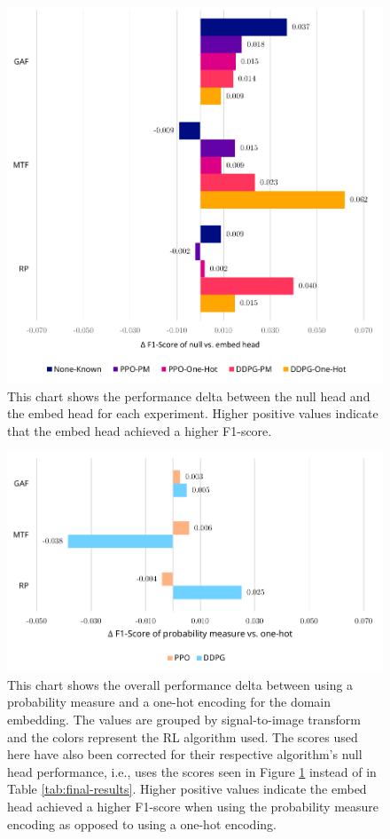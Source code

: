 \begin{figure}
	\centering
	\includegraphics[width=6in]{figures/results_delta}
	\caption{This chart shows the performance delta between the null head and the embed head for each experiment. Higher positive values indicate that the embed head achieved a higher F1-score.}
	\label{fig:results-delta}
\end{figure}

\begin{figure}
	\centering
	\includegraphics[width=6in]{figures/results_encoding}
	\caption{This chart shows the overall performance delta between using a probability measure and a one-hot encoding for the domain embedding. The values are grouped by signal-to-image transform and the colors represent the RL algorithm used. The scores used here have also been corrected for their respective algorithm's null head performance, i.e., uses the scores seen in Figure \ref{fig:results-delta} instead of in Table \ref{tab:final-results}. Higher positive values indicate the embed head achieved a higher F1-score when using the probability measure encoding as opposed to using a one-hot encoding.}
	\label{fig:results-encoding}
\end{figure}

